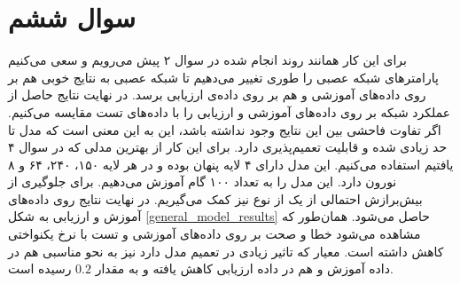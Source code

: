 \documentclass[12pt, a4paper]{article}
\begin{document}
\clearpage

\section*{سوال ششم}

برای این کار همانند روند انجام شده در سوال ۲ پیش می‌رویم و سعی می‌کنیم پارامتر‌های شبکه عصبی را
طوری تغییر می‌دهیم تا شبکه عصبی به نتایج خوبی هم بر روی داده‌های آموزشی و هم بر روی داده‌ی ارزیابی
برسد. در نهایت نتایج حاصل از عملکرد شبکه بر روی داده‌های آموزشی و ارزیابی را با داده‌های تست
مقایسه می‌کنیم. اگر تفاوت فاحشی بین این نتایج وجود نداشته باشد، این به این معنی است که مدل تا
حد زیادی  شده و قابلیت تعمیم‌پذیری دارد. برای این کار از بهترین مدلی که در سوال ۴ یافتیم
استفاده می‌کنیم. این مدل دارای ۴ لایه پنهان بوده و در هر لایه ۱۵۰، ۲۴۰، ۶۴ و ۸ نورون دارد.
این مدل را به تعداد ۱۰۰ گام آموزش می‌دهیم. برای جلوگیری از بیش‌برازش احتمالی از یک 
از نوع  نیز کمک می‌گیریم. در نهایت نتایج روی داده‌های آموزش و ارزیابی به شکل
\ref{general_model_results} حاصل می‌شود. همان‌طور که مشاهده می‌شود خطا و صحت بر روی داده‌های آموزشی و تست
با نرخ یکنواختی کاهش داشته است. معیار  که تاثیر زیادی در تعمیم مدل دارد نیز به نحو
مناسبی هم در داده آموزش و هم در داده ارزیابی کاهش یافته و به مقدار $0.2$ رسیده است.
\end{document}
